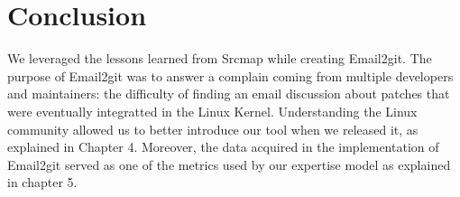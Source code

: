 \section{Conclusion}

We leveraged the lessons learned from Srcmap while creating Email2git. The purpose of Email2git was to answer a complain coming from multiple developers and maintainers: the difficulty of finding an email discussion about patches that were eventually integratted in the Linux Kernel. Understanding the Linux community allowed us to better introduce our tool when we released it, as explained in Chapter 4. Moreover, the data acquired in the implementation of Email2git served as one of the metrics used by our expertise model as explained in chapter 5.



